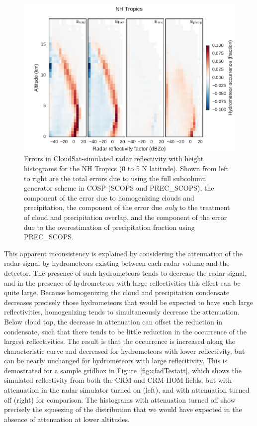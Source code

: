 \begin{figure}[htbp]
\centering
\includegraphics{graphics/subgrid1_cfadDbze94_NHTropics_diff.pdf}
\caption{\label{fig:cfadTropicsMroDiff}Errors in CloudSat-simulated
radar reflectivity with height histograms for the NH Tropics (0 to 5 N
latitude). Shown from left to right are the total errors due to using
the full subcolumn generator scheme in COSP (SCOPS and PREC\_SCOPS), the
component of the error due to homogenizing clouds and precipitation, the
component of the error due \emph{only} to the treatment of cloud and
precipitation overlap, and the component of the error due to the
overestimation of precipitation fraction using
PREC\_SCOPS.}\label{fig:cfadTropicsMroDiff}
\end{figure}

This apparent inconsistency is explained by considering the attenuation
of the radar signal by hydrometeors existing between each radar volume
and the detector. The presence of such hydrometeors tends to decrease
the radar signal, and in the presence of hydrometeors with large
reflectivities this effect can be quite large. Because homogenizing the
cloud and precipitation condensate decreases precisely those
hydrometeors that would be expected to have such large reflectivities,
homogenizing tends to simultaneously decrease the attenuation. Below
cloud top, the decrease in attenuation can offset the reduction in
condensate, such that there tends to be little reduction in the
occurrence of the largest reflectivities. The result is that the
occurrence is increased along the characteristic curve and decreased for
hydrometeors with lower reflectivity, but can be nearly unchanged for
hydrometeors with large reflecitivity. This is demostrated for a sample
gridbox in Figure~\ref{fig:cfadTestatt}, which shows the simulated
reflectivity from both the CRM and CRM-HOM fields, but with attenuation
in the radar simulator turned on (left), and with attenuation turned off
(right) for comparison. The histograms with attenuation turned off show
precisely the squeezing of the distribution that we would have expected
in the absence of attenuation at lower altitudes.

